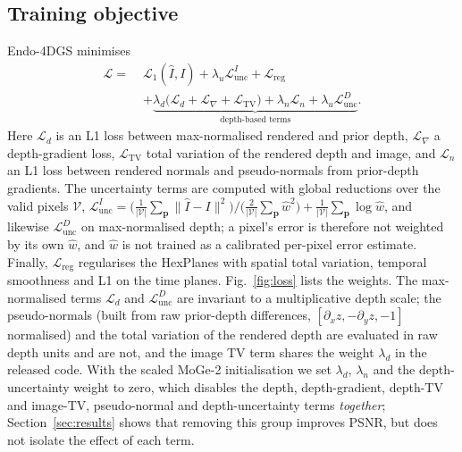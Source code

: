 \documentclass[conference]{IEEEtran}
\begin{document}
\subsection{Training objective}
\label{sec:objective}
Endo-4DGS minimises
\begin{equation}
\begin{aligned}
\mathcal{L}=\;&\mathcal{L}_1(\hat{I},I)+\lambda_u\mathcal{L}^{I}_{\mathrm{unc}}+\mathcal{L}_{\mathrm{reg}}\\
&+\underbrace{\lambda_d\big(\mathcal{L}_{d}+\mathcal{L}_{\nabla}+\mathcal{L}_{\mathrm{TV}}\big)+\lambda_n\mathcal{L}_{n}+\lambda_u\mathcal{L}^{D}_{\mathrm{unc}}}_{\text{depth-based terms}} .
\end{aligned}
\label{eq:loss}
\end{equation}
Here $\mathcal{L}_d$ is an L1 loss between max-normalised rendered and prior depth, $\mathcal{L}_\nabla$ a depth-gradient loss, $\mathcal{L}_{\mathrm{TV}}$ total variation of the rendered depth and image, and $\mathcal{L}_n$ an L1 loss between rendered normals and pseudo-normals from prior-depth gradients. The uncertainty terms are computed with global reductions over the valid pixels $\mathcal{V}$,
$\mathcal{L}^{I}_{\mathrm{unc}}=\big(\tfrac{1}{|\mathcal{V}|}\sum_{\mathbf{p}}\|\hat{I}-I\|^2\big)\big/\big(\tfrac{2}{|\mathcal{V}|}\sum_{\mathbf{p}}\hat{w}^2\big)+\tfrac{1}{|\mathcal{V}|}\sum_{\mathbf{p}}\log\hat{w}$,
and likewise $\mathcal{L}^{D}_{\mathrm{unc}}$ on max-normalised depth; a pixel's error is therefore not weighted by its own $\hat{w}$, and $\hat{w}$ is not trained as a calibrated per-pixel error estimate. Finally, $\mathcal{L}_{\mathrm{reg}}$ regularises the HexPlanes with spatial total variation, temporal smoothness and L1 on the time planes. Fig.~\ref{fig:loss} lists the weights. The max-normalised terms $\mathcal{L}_d$ and $\mathcal{L}^{D}_{\mathrm{unc}}$ are invariant to a multiplicative depth scale; the pseudo-normals (built from raw prior-depth differences, $[\partial_x z, -\partial_y z, -1]$ normalised) and the total variation of the rendered depth are evaluated in raw depth units and are not, and the image TV term shares the weight $\lambda_d$ in the released code. With the scaled MoGe-2 initialisation we set $\lambda_d$, $\lambda_n$ and the depth-uncertainty weight to zero, which disables the depth, depth-gradient, depth-TV and image-TV, pseudo-normal and depth-uncertainty terms \emph{together}; Section~\ref{sec:results} shows that removing this group improves PSNR, but does not isolate the effect of each term.
\end{document}
